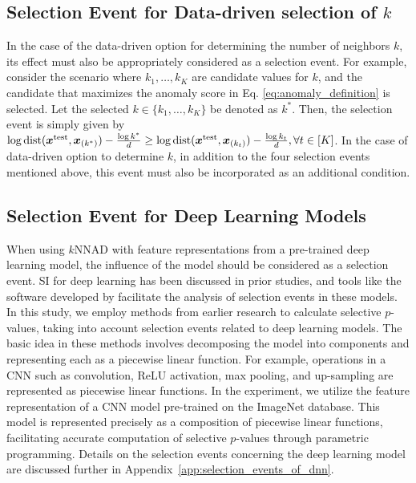 \subsection{Selection Event for Data-driven selection of $k$}
%
In the case of the data-driven option for determining the number of neighbors $k$, its effect must also be appropriately considered as a selection event.  
%
For example, consider the scenario where $k_1, \ldots, k_K$ are candidate values for $k$, and the candidate that maximizes the anomaly score in Eq. \eqref{eq:anomaly_definition} is selected.  
%
Let the selected $k \in \{k_1, \ldots, k_K\}$ be denoted as $k^*$.
%
Then, the selection event is simply given by $\log {\rm dist}(\bm x^{\rm test}, \bm x_{(k^*)}) - \frac{\log k^*}{d} \ge \log {\rm dist}(\bm x^{\rm test}, \bm x_{(k_t)}) - \frac{\log k_t}{d}, \forall t \in [K]$.
%
In the case of data-driven option to determine $k$, in addition to the four selection events mentioned above, this event must also be incorporated as an additional condition.

\subsection{Selection Event for Deep Learning Models}
%
When using $k$NNAD with feature representations from a pre-trained deep learning model, the influence of the model should be considered as a selection event.
%
SI for deep learning has been discussed in prior studies, and tools like the software developed by \citet{katsuoka2025si4onnx} facilitate the analysis of selection events in these models.
%
In this study, we employ methods from earlier research to calculate selective $p$-values, taking into account selection events related to deep learning models.
%
The basic idea in these methods involves decomposing the model into components and representing each as a piecewise linear function.
%
For example, operations in a CNN such as convolution, ReLU activation, max pooling, and up-sampling are represented as piecewise linear functions.
%
In the experiment, we utilize the feature representation of a CNN model pre-trained on the ImageNet database.
%
This model is represented precisely as a composition of piecewise linear functions, facilitating accurate computation of selective $p$-values through parametric programming.
%
Details on the selection events concerning the deep learning model are discussed further in Appendix~\ref{app:selection_events_of_dnn}.


